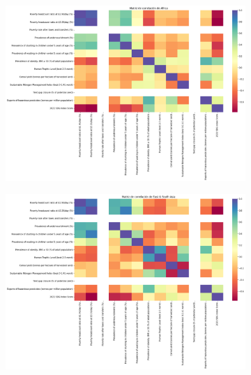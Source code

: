 \documentclass[a4paper,12pt]{amsart}
\begin{document}
    \begin{figure}[!h]
        \centering
        \begin{subfigure}{0.49\textwidth}
            \includegraphics[width=\linewidth]{Images/Corr_africa.png}
        \end{subfigure}
        \begin{subfigure}{0.49\textwidth}
            \includegraphics[width=\linewidth]{Images/Corr_asia.png}
        \end{subfigure}
        \begin{subfigure}{0.49\textwidth}

\end{subfigure}
\end{figure}
\end{document}
